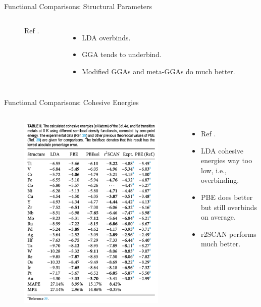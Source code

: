\documentclass[aspectratio=169]{beamer}
\begin{document}
\begin{frame}{Functional Comparisons: Structural Parameters}
\begin{columns}
\begin{figure}
    \caption{Ref \cite{liuAssessingR2SCANMetaGGA2024}.}
\end{figure}
\begin{itemize}
    \item LDA overbinds.
    \item GGA tends to underbind.
    \item Modified GGAs and meta-GGAs do much better.
\end{itemize}
\end{columns} 
\end{frame} 


\begin{frame}{Functional Comparisons: Cohesive Energies}
\begin{columns}
\begin{figure}
    \includegraphics[width=\linewidth]{lectures/figures/6_cohesive_energies.png}
\end{figure}
\begin{itemize}
    \item Ref \cite{liuAssessingR2SCANMetaGGA2024}.
    \item LDA cohesive energies way too low, i.e., overbinding.
    \item PBE does better but still overbinds on average.
    \item r2SCAN performs much better.
\end{itemize}
\end{columns} 
\end{frame} 
\end{document}
